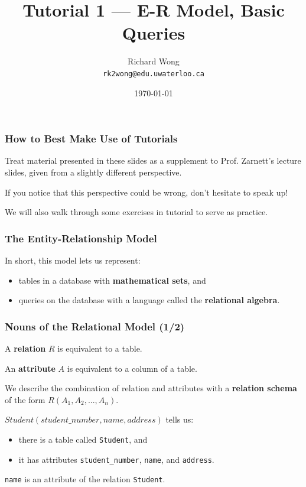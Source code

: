 

\title{Tutorial 1 --- E-R Model, Basic Queries}

\author{Richard Wong \\ \small \texttt{rk2wong@edu.uwaterloo.ca}}
\date{\today}




\begin{frame}
  \titlepage

\end{frame}


\begin{frame}
\frametitle{How to Best Make Use of Tutorials}

Treat material presented in these slides as a supplement to Prof. Zarnett's lecture slides, given from a slightly different perspective.

If you notice that this perspective could be wrong, don't hesitate to speak up!

We will also walk through some exercises in tutorial to serve as practice.

\end{frame}

\begin{frame}
\frametitle{The Entity-Relationship Model}

In short, this model lets us represent:\\
\begin{itemize}
  \item tables in a database with \textbf{mathematical sets}, and
  \item queries on the database with a language called the \textbf{relational algebra}.
\end{itemize}

\end{frame}


\begin{frame}
\frametitle{Nouns of the Relational Model (1/2)}

A \textbf{relation} $R$ is equivalent to a table.

An \textbf{attribute} $A$ is equivalent to a column of a table.

We describe the combination of relation and attributes with a \textbf{relation schema} of the form $R(A_1, A_2, ... , A_n)$.

$Student(student\_number, name, address)$ tells us:\\
\begin{itemize}
  \item there is a table called \texttt{Student}, and
  \item it has attributes \texttt{student\_number}, \texttt{name}, and \texttt{address}.
\end{itemize}

\texttt{name} is an attribute of the relation \texttt{Student}.

\end{frame}

